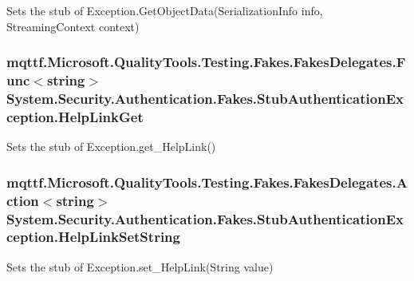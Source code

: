 Sets the stub of Exception.\-Get\-Object\-Data(\-Serialization\-Info info, Streaming\-Context context)

\hypertarget{class_system_1_1_security_1_1_authentication_1_1_fakes_1_1_stub_authentication_exception_abdb460c736c8f9a5b82a06790fa92c30}{
\subsubsection[{Help\-Link\-Get}]{\setlength{\rightskip}{0pt plus 5cm}mqttf.\-Microsoft.\-Quality\-Tools.\-Testing.\-Fakes.\-Fakes\-Delegates.\-Func$<$string$>$ System.\-Security.\-Authentication.\-Fakes.\-Stub\-Authentication\-Exception.\-Help\-Link\-Get}}\label{class_system_1_1_security_1_1_authentication_1_1_fakes_1_1_stub_authentication_exception_abdb460c736c8f9a5b82a06790fa92c30}


Sets the stub of Exception.\-get\-\_\-\-Help\-Link()

\hypertarget{class_system_1_1_security_1_1_authentication_1_1_fakes_1_1_stub_authentication_exception_abb98c5323f74cb52760df1705e11fda4}{
\subsubsection[{Help\-Link\-Set\-String}]{\setlength{\rightskip}{0pt plus 5cm}mqttf.\-Microsoft.\-Quality\-Tools.\-Testing.\-Fakes.\-Fakes\-Delegates.\-Action$<$string$>$ System.\-Security.\-Authentication.\-Fakes.\-Stub\-Authentication\-Exception.\-Help\-Link\-Set\-String}}\label{class_system_1_1_security_1_1_authentication_1_1_fakes_1_1_stub_authentication_exception_abb98c5323f74cb52760df1705e11fda4}


Sets the stub of Exception.\-set\-\_\-\-Help\-Link(\-String value)

